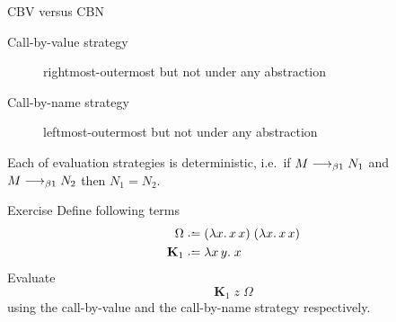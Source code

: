 \begin{frame}{CBV versus CBN}
\begin{description}
  \item[Call-by-value strategy]
    rightmost-outermost but not under any abstraction
  \item[Call-by-name strategy]
    leftmost-outermost but not under any abstraction
\end{description}

\begin{proposition}[Determinacy]
  Each of evaluation strategies is deterministic, i.e.\ 
  if $M \longrightarrow_{\beta1} N_1$ and $M \longrightarrow_{\beta1} N_2$ then $N_1 = N_2$.
\end{proposition}
\end{frame}

\begin{frame}{Exercise}
  Define following terms
\begin{align*}
  \Omega &\defeq (\lambda x.\, x\,x)\;(\lambda x.\,x\,x) \\
  \mathbf{K}_1 & \defeq \lambda x\,y.\;x
\end{align*}
Evaluate 
\[
  \mathbf{K}_1\;z\;\Omega
\]
using the call-by-value and the call-by-name strategy respectively.
\end{frame}

